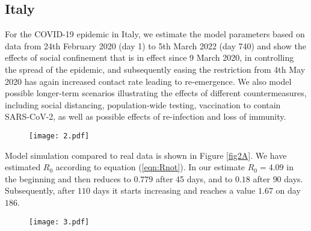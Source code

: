 \documentclass[10pt]{wlscirep}
\begin{document}
\subsection*{Italy}
For the COVID-19 epidemic in Italy, we estimate the model parameters based on data from 24th February 2020 (day 1) to 5th March 2022 (day 740) and show the effects of social confinement that is in effect since 9 March 2020, in controlling the spread of the epidemic, and subsequently easing the restriction from 4th May 2020 has again increased contact rate leading to re-emergence. We also model possible longer-term scenarios illustrating the effects of different countermeasures, including social distancing, population-wide testing, vaccination to contain SARS-CoV-2, as well as possible effects of re-infection and loss of immunity.
%
%
\begin{figure*}[t!]
	\centering
	\begin{subfigure}[b]{\textwidth}
		\centering
		\texttt{[image: 2.pdf]}
	\end{subfigure}
	\caption{Model simulation compared to real data (Italy) - Comparison between the official data (histogram) and the results with our model. Description of panels: \textbf{(a):} Number of currently active cases, $\left( Q(t) + H(t) + C(t)\right)$, \textbf{(b):} number of reported recovered individuals. $\int_{0}^{t}{\left( \mu Q(s) + \psi H(s) + \zeta  C(s) \right) ds}$, \textbf{(c):} number of reported infected with life-threatening symptoms, admitted to ICU, $C(t)$, \textbf{(d):} Number of deceased individuals $D(t)$, \textbf{(e):} number of reported infected with no (or mild) symptoms, who are quarantined at home. $Q(t)$ , \textbf{(f):} number of reported infected with symptoms, who are hospitalized. $H(t)$}
	\label{fig2A} 
\end{figure*}
%

Model simulation compared to real data is shown in Figure \ref{fig2A}. We have estimated $R_0$ according to equation (\ref*{eqn:Rnot}). In our estimate $R_0 = 4.09$ in the beginning and then reduces to $0.779$ after 45 days, and to $0.18$ after $90$ days. Subsequently, after $110$ days it starts increasing and reaches a value $1.67$ on day $186$.
%
\begin{figure*}[t!]
	\centering
	\begin{subfigure}[b]{\textwidth}
		\centering
		\texttt{[image: 3.pdf]}
	\end{subfigure}
	\caption{Model simulation compared to real data (Italy) - Epidemic evolution predicted by the model based on the available data. Description of panels: \textbf{(a, c):} The short-term epidemic evolution obtained by reproducing the data trend with the model, \textbf{(b, d):} Long term epidemic evolution over 700 days. Plots refers to all cases of infection, both diagnosed and non-diagnosed, predicted by the model, although non-diagnosed cases are of course not counted in the data. Note that not all panels are in the same scale.}
	\label{fig2B} 
\end{figure*}
%
\end{document}
